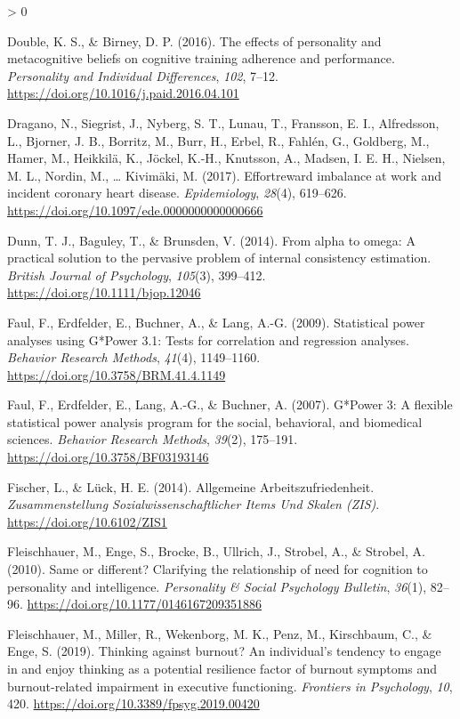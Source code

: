\documentclass[
  english,
  man,floatsintext]{apa6}
\newlength{\cslhangindent}
\newenvironment{CSLReferences}[2] %
 {%
  \setlength{\parindent}{0pt}
  \ifodd #1 \everypar{\setlength{\hangindent}{\cslhangindent}}\ignorespaces\fi
  \ifnum #2 > 0
  \setlength{\parskip}{#2\baselineskip}
  \fi
 }%
 {}
\begin{document}
\begin{CSLReferences}{1}{0}
\leavevmode\hypertarget{ref-Double2016}{}%
Double, K. S., \& Birney, D. P. (2016). The effects of personality and metacognitive beliefs on cognitive training adherence and performance. \emph{Personality and Individual Differences}, \emph{102}, 7--12. \url{https://doi.org/10.1016/j.paid.2016.04.101}

\leavevmode\hypertarget{ref-Dragano2017}{}%
Dragano, N., Siegrist, J., Nyberg, S. T., Lunau, T., Fransson, E. I., Alfredsson, L., Bjorner, J. B., Borritz, M., Burr, H., Erbel, R., Fahlén, G., Goldberg, M., Hamer, M., Heikkilä, K., Jöckel, K.-H., Knutsson, A., Madsen, I. E. H., Nielsen, M. L., Nordin, M., \ldots{} Kivimäki, M. (2017). Effort{{}}reward imbalance at work and incident coronary heart disease. \emph{Epidemiology}, \emph{28}(4), 619--626. \url{https://doi.org/10.1097/ede.0000000000000666}

\leavevmode\hypertarget{ref-Dunn2014}{}%
Dunn, T. J., Baguley, T., \& Brunsden, V. (2014). From alpha to omega: {A} practical solution to the pervasive problem of internal consistency estimation. \emph{British Journal of Psychology}, \emph{105}(3), 399--412. \url{https://doi.org/10.1111/bjop.12046}

\leavevmode\hypertarget{ref-Faul2009}{}%
Faul, F., Erdfelder, E., Buchner, A., \& Lang, A.-G. (2009). Statistical power analyses using {G}*{Power} 3.1: {Tests} for correlation and regression analyses. \emph{Behavior Research Methods}, \emph{41}(4), 1149--1160. \url{https://doi.org/10.3758/BRM.41.4.1149}

\leavevmode\hypertarget{ref-Faul2007}{}%
Faul, F., Erdfelder, E., Lang, A.-G., \& Buchner, A. (2007). G*{Power} 3: {A} flexible statistical power analysis program for the social, behavioral, and biomedical sciences. \emph{Behavior Research Methods}, \emph{39}(2), 175--191. \url{https://doi.org/10.3758/BF03193146}

\leavevmode\hypertarget{ref-Fischer2014}{}%
Fischer, L., \& Lück, H. E. (2014). Allgemeine {Arbeitszufriedenheit}. \emph{Zusammenstellung Sozialwissenschaftlicher Items Und Skalen (ZIS)}. \url{https://doi.org/10.6102/ZIS1}

\leavevmode\hypertarget{ref-Fleischhauer2010}{}%
Fleischhauer, M., Enge, S., Brocke, B., Ullrich, J., Strobel, A., \& Strobel, A. (2010). Same or different? {Clarifying} the relationship of need for cognition to personality and intelligence. \emph{Personality \& Social Psychology Bulletin}, \emph{36}(1), 82--96. \url{https://doi.org/10.1177/0146167209351886}

\leavevmode\hypertarget{ref-Fleischhauer2019}{}%
Fleischhauer, M., Miller, R., Wekenborg, M. K., Penz, M., Kirschbaum, C., \& Enge, S. (2019). Thinking against burnout? {An} individual's tendency to engage in and enjoy thinking as a potential resilience factor of burnout symptoms and burnout-related impairment in executive functioning. \emph{Frontiers in Psychology}, \emph{10}, 420. \url{https://doi.org/10.3389/fpsyg.2019.00420}


\end{CSLReferences}
\end{document}
